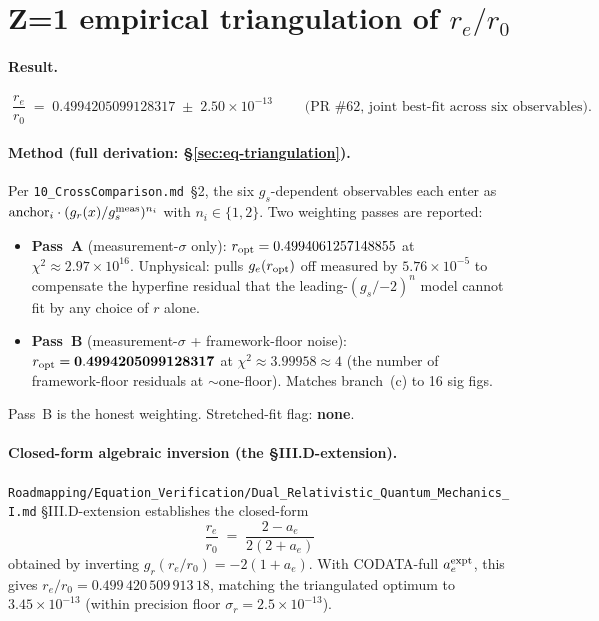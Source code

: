 \section{Z=1 empirical triangulation of \texorpdfstring{$r_e/r_0$}{r\_e/r\_0}}
\label{sec:z1-triangulation}

\paragraph{Result.}
\[
\boxed{\;
  \frac{r_e}{r_0} \;=\; 0.4994205099128317 \;\pm\; 2.50\times 10^{-13}
\;}\qquad \text{(PR \#62, joint best-fit across six observables).}
\]

\paragraph{Method (full derivation: \S\ref{sec:eq-triangulation}).}
Per \texttt{10\_CrossComparison.md}~\S2, the six $g_s$-dependent observables
each enter as $\mathrm{anchor}_i \cdot (g_r(x)/g_s^{\rm meas})^{n_i}$ with
$n_i \in \{1, 2\}$. Two weighting passes are reported:
\begin{itemize}[topsep=2pt,itemsep=0pt]
  \item \textbf{Pass~A} (measurement-$\sigma$ only): $r_{\rm opt} =
        0.4994061257148855$ at $\chi^2 \approx 2.97\times 10^{16}$.
        Unphysical: pulls $g_e(r_{\rm opt})$ off measured by
        $5.76\times 10^{-5}$ to compensate the hyperfine residual that the
        leading-$(g_s/{-2})^n$ model cannot fit by any choice of $r$ alone.
  \item \textbf{Pass~B} (measurement-$\sigma$ + framework-floor noise):
        $r_{\rm opt} = \mathbf{0.4994205099128317}$ at
        $\chi^2 \approx 3.99958 \approx 4$ (the number of framework-floor
        residuals at $\sim$one-floor). Matches branch~(c) to 16 sig figs.
\end{itemize}
Pass~B is the honest weighting. Stretched-fit flag: \textbf{none}.

\paragraph{Closed-form algebraic inversion (the \S III.D-extension).}
\texttt{Roadmapping/Equation\_Verification/Dual\_Relativistic\_Quantum\_Mechanics\_I.md}
\S III.D-extension establishes the closed-form
\[
\boxed{\;
  \frac{r_e}{r_0} \;=\; \frac{2 - a_e}{2(2 + a_e)}
\;}
\]
obtained by inverting $g_r(r_e/r_0) = -2(1 + a_e)$. With CODATA-full
$a_e^{\rm expt}$, this gives $r_e/r_0 = 0.499\,420\,509\,913\,18$, matching
the triangulated optimum to $3.45\times 10^{-13}$ (within precision floor
$\sigma_r = 2.5\times 10^{-13}$).

